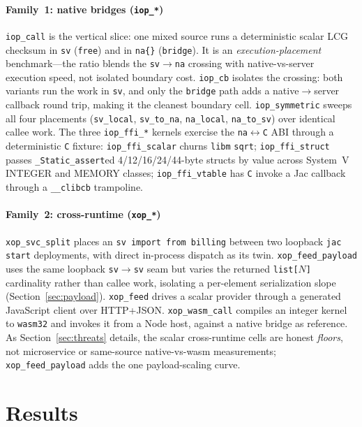 \documentclass[conference]{IEEEtran}
\newcommand{\code}[1]{\texttt{#1}}
\begin{document}
\paragraph{Family~1: native bridges (\code{iop\_*})}
\code{iop\_call} is the vertical slice: one mixed source runs a deterministic
scalar LCG checksum in \code{sv} (\code{free}) and in \code{na\{\}}
(\code{bridge}). It is an \emph{execution-placement} benchmark---the ratio blends
the \code{sv$\rightarrow$na} crossing with native-vs-server execution speed, not
isolated boundary cost. \code{iop\_cb} isolates the crossing: both variants run
the work in \code{sv}, and only the \code{bridge} path adds a
native$\rightarrow$server callback round trip, making it the cleanest boundary
cell. \code{iop\_symmetric} sweeps all four placements (\code{sv\_local},
\code{sv\_to\_na}, \code{na\_local}, \code{na\_to\_sv}) over identical callee
work. The three \code{iop\_ffi\_*} kernels exercise the \code{na$\leftrightarrow$C}
ABI through a deterministic \code{C} fixture: \code{iop\_ffi\_scalar} churns
\code{libm} \code{sqrt}; \code{iop\_ffi\_struct} passes
\code{\_Static\_assert}ed 4/12/16/24/44-byte structs by value across System~V
INTEGER and MEMORY classes; \code{iop\_ffi\_vtable} has \code{C} invoke a Jac
callback through a \code{\_\_clibcb} trampoline.

\paragraph{Family~2: cross-runtime (\code{xop\_*})}
\code{xop\_svc\_split} places an \code{sv import from billing} between two
loopback \code{jac start} deployments, with direct in-process dispatch as its
twin. \code{xop\_feed\_payload} uses the same loopback \code{sv$\rightarrow$sv}
seam but varies the returned \code{list[$N$]} cardinality rather than callee work,
isolating a per-element serialization slope (Section~\ref{sec:payload}).
\code{xop\_feed} drives a scalar provider through a generated JavaScript
client over HTTP+JSON. \code{xop\_wasm\_call} compiles an integer kernel to
\code{wasm32} and invokes it from a Node host, against a native bridge as
reference. As Section~\ref{sec:threats} details, the scalar cross-runtime cells
are honest \emph{floors}, not microservice or same-source native-vs-wasm
measurements; \code{xop\_feed\_payload} adds the one payload-scaling curve.

\section{Results}
\label{sec:results}
\end{document}
